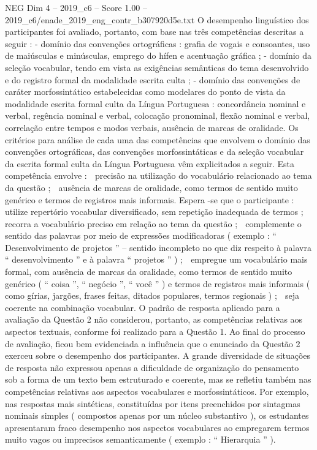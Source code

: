 \begin{textsample}{NEG Dim 4 – 2019\_c6 – Score 1.00 – 2019\_c6/enade\_2019\_eng\_contr\_b307920d5e.txt}
O desempenho linguístico dos participantes foi avaliado, portanto, com base nas três competências descritas a seguir : - domínio das convenções ortográficas : grafia de vogais e consoantes, uso de maiúsculas e minúsculas, emprego do hífen e acentuação gráfica ; - domínio da seleção vocabular, tendo em vista as exigências semânticas do tema desenvolvido e do registro formal da modalidade escrita culta ; - domínio das convenções de caráter morfossintático estabelecidas como modelares do ponto de vista da modalidade escrita formal culta da Língua Portuguesa : concordância nominal e verbal, regência nominal e verbal, colocação pronominal, flexão nominal e verbal, correlação entre tempos e modos verbais, ausência de marcas de oralidade.
Os critérios para análise de cada uma das competências que envolvem o domínio das convenções ortográficas, das convenções morfossintáticas e da seleção vocabular da escrita formal culta da Língua Portuguesa vêm explicitados a seguir.
Esta competência envolve :  precisão na utilização do vocabulário relacionado ao tema da questão ;  ausência de marcas de oralidade, como termos de sentido muito genérico e termos de registros mais informais.
Espera -se que o participante :  utilize repertório vocabular diversificado, sem repetição inadequada de termos ;  recorra a vocabulário preciso em relação ao tema da questão ;  complemente o sentido das palavras por meio de expressões modificadoras ( exemplo : “ Desenvolvimento de projetos ” – sentido incompleto no que diz respeito à palavra “ desenvolvimento ” e à palavra “ projetos ” ) ;  empregue um vocabulário mais formal, com ausência de marcas da oralidade, como termos de sentido muito genérico ( “ coisa ”, “ negócio ”, “ você ” ) e termos de registros mais informais ( como gírias, jargões, frases feitas, ditados populares, termos regionais ) ;  seja coerente na combinação vocabular.
O padrão de resposta aplicado para a avaliação da Questão 2 não considerou, portanto, as competências relativas aos aspectos textuais, conforme foi realizado para a Questão 1.
Ao final do processo de avaliação, ficou bem evidenciada a influência que o enunciado da Questão 2 exerceu sobre o desempenho dos participantes.
A grande diversidade de situações de resposta não expressou apenas a dificuldade de organização do pensamento sob a forma de um texto bem estruturado e coerente, mas se refletiu também nas competências relativas aos aspectos vocabulares e morfossintáticos.
Por exemplo, nas respostas mais sintéticas, constituídas por itens preenchidos por sintagmas nominais simples ( compostos apenas por um núcleo substantivo ), os estudantes apresentaram fraco desempenho nos aspectos vocabulares ao empregarem termos muito vagos ou imprecisos semanticamente ( exemplo : “ Hierarquia ” ).

\end{textsample}
